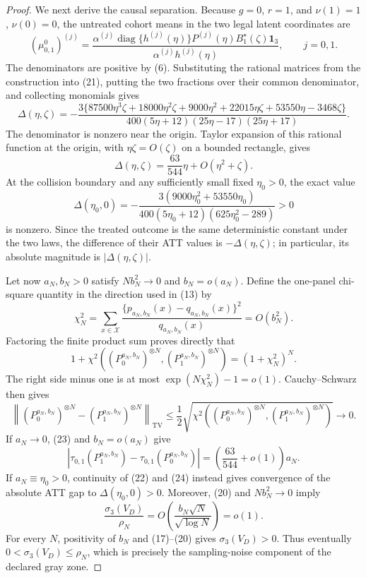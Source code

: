\documentclass{article}
\begin{document}
\begin{proof}
We next derive the causal separation. Because \(g=0\), \(r=1\), and \(\nu(1)=1\), \(\nu(0)=0\), the untreated cohort means in the two legal latent coordinates are
\[
 (\mu^0_{0,1})^{(j)}
 =\frac{\alpha^{(j)}\operatorname{diag}\{h^{(j)}(\eta)\}
 P^{(j)}(\eta)B_1^{\star}(\zeta)\mathbf 1_3}
 {\alpha^{(j)}h^{(j)}(\eta)},
 \qquad j=0,1.                                                \tag{21}
\]
The denominators are positive by (6). Substituting the rational matrices from the construction into (21), putting the two fractions over their common denominator, and collecting monomials gives
\[
 \Delta(\eta,\zeta)
 =-\frac{3\{87500\eta^3\zeta+18000\eta^2\zeta+9000\eta^2+22015\eta\zeta+53550\eta-3468\zeta\}}
 {400(5\eta+12)(25\eta-17)(25\eta+17)}.                    \tag{22}
\]
The denominator is nonzero near the origin. Taylor expansion of this rational function at the origin, with \(\eta\zeta=O(\zeta)\) on a bounded rectangle, gives
\[
 \Delta(\eta,\zeta)=\frac{63}{544}\eta+O(\eta^2+\zeta).   \tag{23}
\]
At the collision boundary and any sufficiently small fixed \(\eta_0>0\), the exact value
\[
 \Delta(\eta_0,0)
 =-\frac{3(9000\eta_0^2+53550\eta_0)}
 {400(5\eta_0+12)(625\eta_0^2-289)}>0                       \tag{24}
\]
is nonzero. Since the treated outcome is the same deterministic constant under the two laws, the difference of their ATT values is \(-\Delta(\eta,\zeta)\); in particular, its absolute magnitude is \(|\Delta(\eta,\zeta)|\).

Let now \(a_N,b_N>0\) satisfy \(Nb_N^2\to0\) and \(b_N=o(a_N)\). Define the one-panel chi-square quantity in the direction used in (13) by
\[
 \chi_N^2=\sum_{x\in\mathcal X}
 \frac{\{p_{a_N,b_N}(x)-q_{a_N,b_N}(x)\}^2}
 {q_{a_N,b_N}(x)}=O(b_N^2).                                  \tag{25}
\]
Factoring the finite product sum proves directly that
\[
 1+\chi^2\!\left((P_0^{a_N,b_N})^{\otimes N},
                  (P_1^{a_N,b_N})^{\otimes N}\right)
 =(1+\chi_N^2)^N.                                             \tag{26}
\]
The right side minus one is at most \(\exp(N\chi_N^2)-1=o(1)\). Cauchy--Schwarz then gives
\[
 \left\|(P_0^{a_N,b_N})^{\otimes N}
       -(P_1^{a_N,b_N})^{\otimes N}\right\|_{\mathrm{TV}}
 \le\frac12\sqrt{\chi^2\!\left((P_0^{a_N,b_N})^{\otimes N},
                  (P_1^{a_N,b_N})^{\otimes N}\right)}
 \longrightarrow0.                                           \tag{27}
\]
If \(a_N\to0\), (23) and \(b_N=o(a_N)\) give
\[
 |\tau_{0,1}(P_1^{a_N,b_N})-
   \tau_{0,1}(P_0^{a_N,b_N})|
 =\left(\frac{63}{544}+o(1)\right)a_N.                      \tag{28}
\]
If \(a_N\equiv\eta_0>0\), continuity of (22) and (24) instead gives convergence of the absolute ATT gap to \(\Delta(\eta_0,0)>0\). Moreover, (20) and \(Nb_N^2\to0\) imply
\[
 \frac{\sigma_3(V_D)}{\rho_N}
 =O\!\left(\frac{b_N\sqrt N}{\sqrt{\log N}}\right)
 =o(1).                                                       \tag{29}
\]
For every \(N\), positivity of \(b_N\) and (17)--(20) gives \(\sigma_3(V_D)>0\). Thus eventually \(0<\sigma_3(V_D)\le\rho_N\), which is precisely the sampling-noise component of the declared gray zone.


\end{proof}
\end{document}
